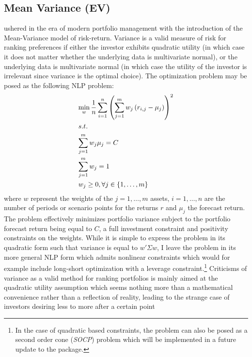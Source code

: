 \subsection{Mean Variance (EV)}
\citet{Markowitz1952} ushered in the era of modern portfolio management
with the introduction of the Mean-Variance model of risk-return. Variance is
a valid measure of risk for ranking preferences if either the investor
exhibits quadratic utility (in which case it does not matter whether the
underlying data is multivariate normal), or the underlying data is
multivariate normal (in which case the utility of the investor is irrelevant
since variance is the optimal choice). The optimization problem may be posed
as the following NLP problem:
\begin{equation}\label{mvnlp}
\begin{gathered}
  \mathop {\min }\limits_w \frac{1}{n}\sum\limits_{i=1}^n {{{\left( {\sum\limits_{j=1}^m {{w_j}\left( {{r_{i,j}} - {\mu _j}} \right)} } \right)}^2}}  \hfill \\
  s.t. \hfill \\
  \sum\limits_{j=1}^m {{w_j}{\mu _j}=C}  \hfill \\
  \sum\limits_{j=1}^m {{w_j}=1}  \hfill \\
  {w_j} \ge 0,\forall j \in \left\{ {1,\dots,m} \right\} \hfill \\
\end{gathered}
\end{equation}
where $w$ represent the weights of the $j=1,\dots,m$ assets, $i=1,\dots,n$
are the number of periods or scenario points for the returns $r$ and $\mu_j$
the forecast return. The problem effectively minimizes portfolio variance
subject to the portfolio forecast return being equal to $C$, a full
investment constraint and positivity constraints on the weights. While it is
simple to express the problem in its quadratic form such that variance is
equal to $w'\Sigma w$, I leave the problem in its more general NLP form which
admits nonlinear constraints which would for example include long-short
optimization with a leverage constraint.\footnote{In the case of quadratic
based constraints, the problem can also be posed as a second order cone
(\emph{SOCP}) problem which will be implemented in a future update to the
package.} Criticisms of variance as a valid method for ranking portfolios is
mainly aimed at the quadratic utility assumption which seems nothing more
than a mathematical convenience rather than a reflection of reality, leading
to the strange case of investors desiring less to more after a certain point
